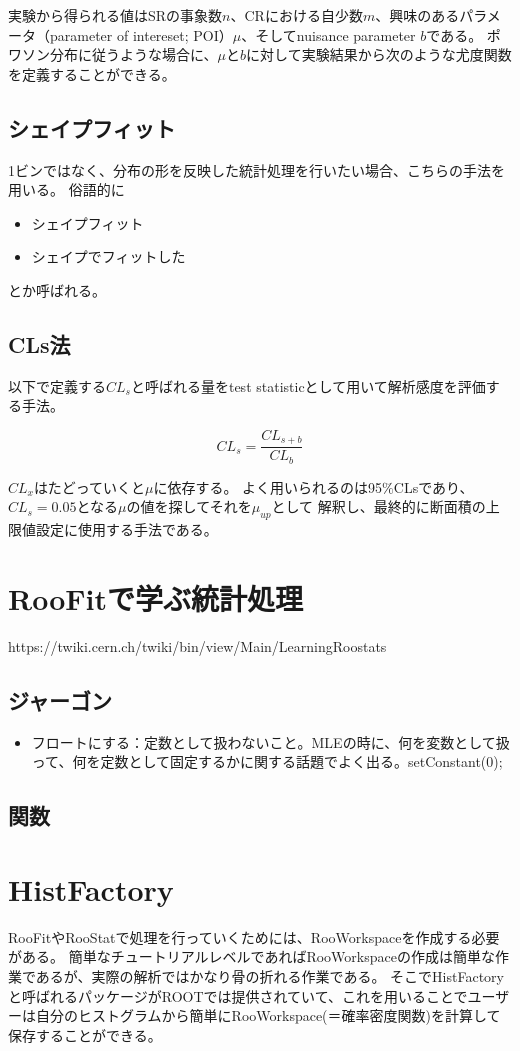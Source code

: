 \documentclass[a4paper,uplatex]{jsreport}
\begin{document}
\begin{euation}
\begin{euation}
\begin{euation}
\begin{euation}
実験から得られる値はSRの事象数$n$、CRにおける自少数$m$、興味のあるパラメータ（parameter of intereset; POI）$\mu$、そしてnuisance parameter $b$である。
ポワソン分布に従うような場合に、$\mu$と$b$に対して実験結果から次のような尤度関数を定義することができる。


\section{シェイプフィット}
1ビンではなく、分布の形を反映した統計処理を行いたい場合、こちらの手法を用いる。
俗語的に
\begin{itemize}
  \item シェイプフィット
  \item シェイプでフィットした
\end{itemize}
とか呼ばれる。

\section{CLs法}
以下で定義する$CL_s$と呼ばれる量をtest statisticとして用いて解析感度を評価する手法。

\begin{equation}
CL_s = \frac{CL_{s+b}}{CL_b}
\end{equation}

$CL_{x}$はたどっていくと$\mu$に依存する。
よく用いられるのは95$\%$CLsであり、$CL_s=0.05$となる$\mu$の値を探してそれを$\mu_{up}$として
解釈し、最終的に断面積の上限値設定に使用する手法である。

\chapter{RooFitで学ぶ統計処理}
https://twiki.cern.ch/twiki/bin/view/Main/LearningRoostats
\section{ジャーゴン}
\begin{itemize}
  \item フロートにする：定数として扱わないこと。MLEの時に、何を変数として扱って、何を定数として固定するかに関する話題でよく出る。setConstant(0);
\end{itemize}
\section{関数}



\chapter{HistFactory}
RooFitやRooStatで処理を行っていくためには、RooWorkspaceを作成する必要がある。
簡単なチュートリアルレベルであればRooWorkspaceの作成は簡単な作業であるが、実際の解析ではかなり骨の折れる作業である。
そこでHistFactoryと呼ばれるパッケージがROOTでは提供されていて、これを用いることでユーザーは自分のヒストグラムから簡単にRooWorkspace(＝確率密度関数)を計算して保存することができる。


\end{euation}
\end{euation}
\end{euation}
\end{euation}
\end{document}
